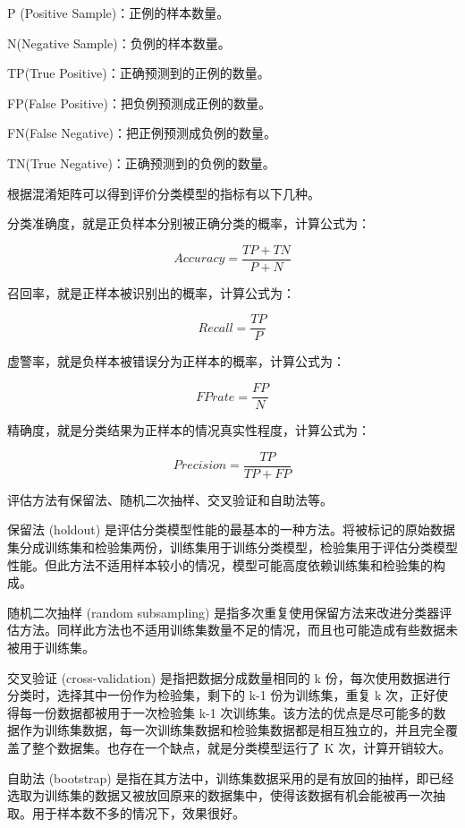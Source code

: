 P (Positive Sample)：正例的样本数量。

N(Negative Sample)：负例的样本数量。

TP(True Positive)：正确预测到的正例的数量。

FP(False Positive)：把负例预测成正例的数量。

FN(False Negative)：把正例预测成负例的数量。

TN(True Negative)：正确预测到的负例的数量。

根据混淆矩阵可以得到评价分类模型的指标有以下几种。

分类准确度，就是正负样本分别被正确分类的概率，计算公式为：

\begin{equation}
Accuracy=\frac{TP+TN}{P+N}
\end{equation}

召回率，就是正样本被识别出的概率，计算公式为：

\begin{equation}
Recall=\frac{TP}{P}
\end{equation}

虚警率，就是负样本被错误分为正样本的概率，计算公式为：

\begin{equation}
FPrate=\frac{FP}{N}
\end{equation}

精确度，就是分类结果为正样本的情况真实性程度，计算公式为：

\begin{equation}
Precision=\frac{TP}{TP+FP}
\end{equation}

评估方法有保留法、随机二次抽样、交叉验证和自助法等。

保留法 (holdout) 是评估分类模型性能的最基本的一种方法。将被标记的原始数据集分成训练集和检验集两份，训练集用于训练分类模型，检验集用于评估分类模型性能。但此方法不适用样本较小的情况，模型可能高度依赖训练集和检验集的构成。

随机二次抽样 (random subsampling) 是指多次重复使用保留方法来改进分类器评估方法。同样此方法也不适用训练集数量不足的情况，而且也可能造成有些数据未被用于训练集。

交叉验证 (cross-validation) 是指把数据分成数量相同的 k 份，每次使用数据进行分类时，选择其中一份作为检验集，剩下的 k-1 份为训练集，重复 k 次，正好使得每一份数据都被用于一次检验集 k-1 次训练集。该方法的优点是尽可能多的数据作为训练集数据，每一次训练集数据和检验集数据都是相互独立的，并且完全覆盖了整个数据集。也存在一个缺点，就是分类模型运行了 K 次，计算开销较大。

自助法 (bootstrap) 是指在其方法中，训练集数据采用的是有放回的抽样，即已经选取为训练集的数据又被放回原来的数据集中，使得该数据有机会能被再一次抽取。用于样本数不多的情况下，效果很好。
\appendix 